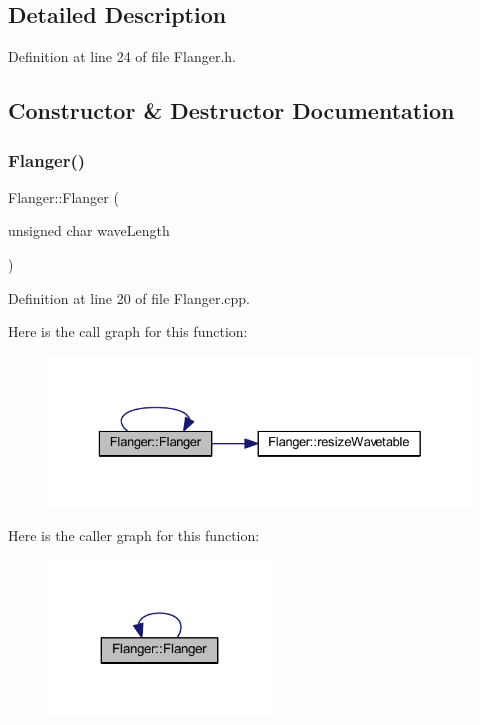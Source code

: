 \subsection{Detailed Description}


Definition at line 24 of file Flanger.\+h.



\subsection{Constructor \& Destructor Documentation}
\mbox{\label{class_flanger_a973e269aa2e2bab6c56e9d4c92b85baf}} 
\subsubsection{\texorpdfstring{Flanger()}{Flanger()}}
{\footnotesize\ttfamily Flanger\+::\+Flanger (\begin{DoxyParamCaption}\item[{unsigned char}]{wave\+Length }\end{DoxyParamCaption})}



Definition at line 20 of file Flanger.\+cpp.

Here is the call graph for this function\+:
\nopagebreak
\begin{figure}[H]
\begin{center}
\leavevmode
\includegraphics[width=329pt]{d5/d64/class_flanger_a973e269aa2e2bab6c56e9d4c92b85baf_cgraph}
\end{center}
\end{figure}
Here is the caller graph for this function\+:
\nopagebreak
\begin{figure}[H]
\begin{center}
\leavevmode
\includegraphics[width=167pt]{d5/d64/class_flanger_a973e269aa2e2bab6c56e9d4c92b85baf_icgraph}
\end{center}
\end{figure}
\mbox{\label{class_flanger_ab37e3e9863d1f762ed25147dd8db2dec}} 
